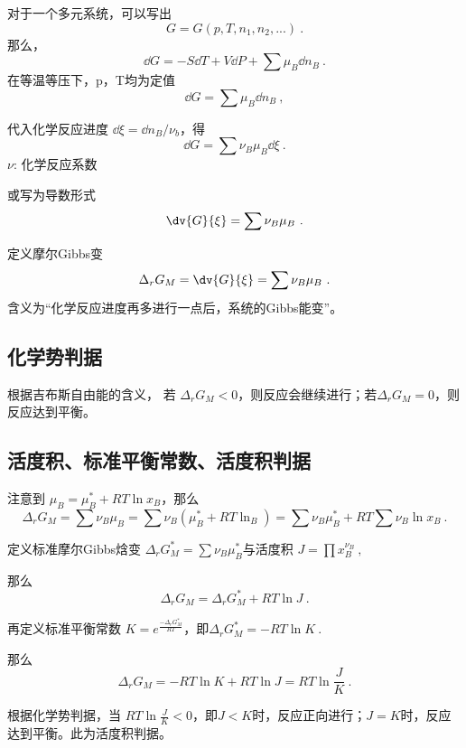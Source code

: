
\begin{issues}
\issueDraft
\end{issues}


对于一个多元系统，可以写出
\begin{equation}
G=G(p,T,n_1,n_2,...)~.
\end{equation}
那么，
\begin{equation}
\dd G=-S \dd T +V \dd P + \sum \mu_B \dd n_B~.
\end{equation}
在等温等压下，p，T均为定值
\begin{equation}
\dd G=\sum \mu_B \dd n_B~,
\end{equation}

代入化学反应进度 $\dd \xi=\dd n_B/\nu_b$，得
\begin{equation}
\dd G=\sum \nu_B \mu_B \dd \xi~.
\end{equation}
$\nu$: 化学反应系数

或写为导数形式
\begin{equation}
\dv{G}{\xi}=\sum \nu_B \mu_B~.
\end{equation}

定义摩尔Gibbs变
\begin{equation}
\Delta _r G_M = \dv{G}{\xi}=\sum \nu_B \mu_B~.
\end{equation}
含义为“化学反应进度再多进行一点后，系统的Gibbs能变”。

\subsection{化学势判据}
根据吉布斯自由能的含义，
若 $\Delta _r G_M<0$，则反应会继续进行；若$\Delta _r G_M = 0$，则反应达到平衡。

\subsection{活度积、标准平衡常数、活度积判据}
注意到 
$\mu_B=\mu_B^*+RT \ln x_B$，那么
\begin{equation} \label{eq_chemBl_1}
\Delta _r G_M =\sum \nu_B \mu_B = \sum \nu_B (\mu_B^*+RT\ln _B)=\sum \nu_B \mu_B^* + RT \sum \nu_B \ln x_B~.
\end{equation}

定义标准摩尔Gibbs焓变 $\Delta _r G_M^*=\sum \nu_B \mu_B^*$与活度积 $J=\prod x_B^{\nu_B}~,$

那么
\begin{equation}
\Delta _r G_M = \Delta _r G_M^* + RT \ln J~.
\end{equation}

再定义标准平衡常数 $K = e^{\frac{-\Delta _r G_M^*}{RT}}$，即$\Delta _r G_M^* = -RT \ln K~.$

那么 
\begin{equation}
\Delta _r G_M = -RT \ln K + RT \ln J = RT \ln \frac{J}{K}~.
\end{equation}

根据化学势判据，当 
$RT \ln \frac{J}{K} < 0$，即$J<K$时，反应正向进行；$J=K$时，反应达到平衡。此为活度积判据。
